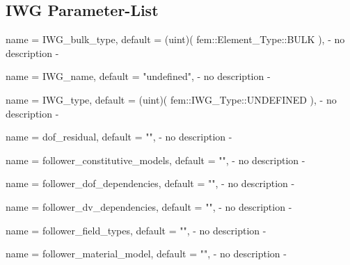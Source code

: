\subsection{IWG Parameter-List}

\begin{parameter}{
    name    = {IWG_bulk_type},
    default = {(uint)( fem::Element_Type::BULK )},
}
- no description -
\end{parameter}

\begin{parameter}{
    name    = {IWG_name},
    default = {"undefined"},
}
- no description -
\end{parameter}

\begin{parameter}{
    name    = {IWG_type},
    default = {(uint)( fem::IWG_Type::UNDEFINED )},
}
- no description -
\end{parameter}

\begin{parameter}{
    name    = {dof_residual},
    default = {""},
}
- no description -
\end{parameter}

\begin{parameter}{
    name    = {follower_constitutive_models},
    default = {""},
}
- no description -
\end{parameter}

\begin{parameter}{
    name    = {follower_dof_dependencies},
    default = {""},
}
- no description -
\end{parameter}

\begin{parameter}{
    name    = {follower_dv_dependencies},
    default = {""},
}
- no description -
\end{parameter}

\begin{parameter}{
    name    = {follower_field_types},
    default = {""},
}
- no description -
\end{parameter}

\begin{parameter}{
    name    = {follower_material_model},
    default = {""},
}
- no description -
\end{parameter}

